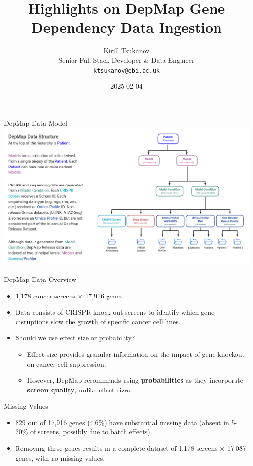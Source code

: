 \documentclass[handout]{beamer}
\title{Highlights on DepMap Gene Dependency Data Ingestion}
\date{2025-02-04}
\author{Kirill Tsukanov \\ Senior Full Stack Developer \& Data Engineer \\ \texttt{ktsukanov@ebi.ac.uk}}
\institute{Open Targets Perturbation Catalogue WP1/2/3 Technical Meeting}
\begin{document}
\begin{frame}
    \titlepage
\end{frame}

\begin{frame}{DepMap Data Model}
    \centering
    \includegraphics[width=0.9\linewidth]{depmap_data_model.png}
\end{frame}

\begin{frame}{DepMap Data Overview}
    \begin{itemize}
        \item 1,178 cancer screens \(\times\) 17,916 genes
        \item Data consists of CRISPR knock-out screens to identify which gene disruptions slow the growth of specific cancer cell lines.
        \item Should we use effect size or probability?
        \begin{itemize}
            \item Effect size provides granular information on the impact of gene knockout on cancer cell suppression.
            \item However, DepMap recommends using \textbf{probabilities} as they incorporate \textbf{screen quality}, unlike effect sizes.
        \end{itemize}
    \end{itemize}
\end{frame}

\begin{frame}{Missing Values}
    \begin{itemize}
        \item 829 out of 17,916 genes (4.6\%) have substantial missing data (absent in 5-30\% of screens, possibly due to batch effects).
        \item Removing these genes results in a complete dataset of 1,178 screens \(\times\) 17,087 genes, with no missing values.
    \end{itemize}
\end{frame}
\end{document}
